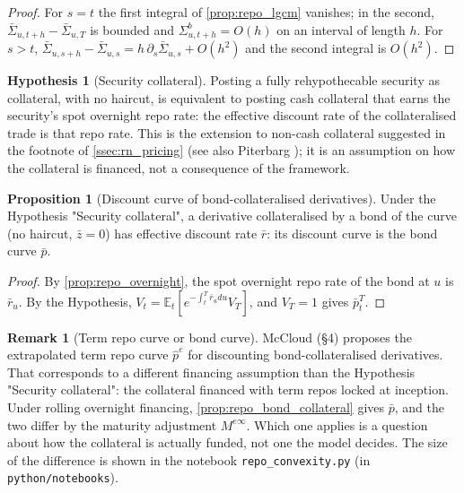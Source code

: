 \documentclass[11pt,english]{amsart}
\newcommand{\EE}{\mathbb{E}}
\theoremstyle{definition}
\newtheorem{prop}{Proposition}
\newtheorem{rema}{Remark}
\newtheorem*{hypo}{Hypothesis}
\begin{document}
\begin{proof}
For $s = t$ the first integral of \autoref{prop:repo_lgcm} vanishes; in the second, $\bar\Sigma_{u,t+h} - \bar\Sigma_{u,T}$ is bounded and $\Sigma^b_{u,t+h} = O(h)$ on an interval of length $h$. For $s > t$, $\bar\Sigma_{u,s+h} - \bar\Sigma_{u,s} = h\,\partial_s\bar\Sigma_{u,s} + O(h^2)$ and the second integral is $O(h^2)$.
\end{proof}

\begin{hypo}[Security collateral]
Posting a fully rehypothecable security as collateral, with no haircut, is equivalent to posting cash collateral that earns the security's spot overnight repo rate: the effective discount rate of the collateralised trade is that repo rate. This is the extension to non-cash collateral suggested in the footnote of \autoref{ssec:rn_pricing} (see also Piterbarg \cite{Piterbarg:Cooking}); it is an assumption on how the collateral is financed, not a consequence of the framework.
\end{hypo}

\begin{prop}[Discount curve of bond-collateralised derivatives]\label{prop:repo_bond_collateral}
Under the Hypothesis "Security collateral", a derivative collateralised by a bond of the curve (no haircut, $\bar z = 0$) has effective discount rate $\bar r$: its discount curve is the bond curve $\bar p$.
\end{prop}

\begin{proof}
By \autoref{prop:repo_overnight}, the spot overnight repo rate of the bond at $u$ is $\bar r_u$. By the Hypothesis, $V_t = \EE_t[e^{-\int_t^T\bar r_u du}V_T]$, and $V_T = 1$ gives $\bar p^T_t$.
\end{proof}

\begin{rema}[Term repo curve or bond curve]
McCloud (\S4) proposes the extrapolated term repo curve $\hat p^e$ for discounting bond-collateralised derivatives. That corresponds to a different financing assumption than the Hypothesis "Security collateral": the collateral financed with term repos locked at inception. Under rolling overnight financing, \autoref{prop:repo_bond_collateral} gives $\bar p$, and the two differ by the maturity adjustment $M^{e\infty}$. Which one applies is a question about how the collateral is actually funded, not one the model decides. The size of the difference is shown in the notebook \texttt{repo\_convexity.py} (in \texttt{python/notebooks}).
\end{rema}
\end{document}

